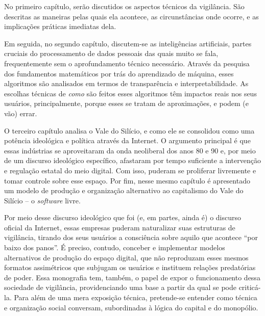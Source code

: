 No primeiro capítulo, serão discutidos os aspectos técnicos da vigilância.
São descritas as maneiras pelas quais ela acontece, as circunstâncias onde ocorre, e as implicações práticas imediatas dela.

Em seguida, no segundo capítulo, discutem-se as inteligências artificiais, partes cruciais do processamento de dados pessoais das quais muito se fala, frequentemente sem o aprofundamento técnico necessário.
Através da pesquisa dos fundamentos matemáticos por trás do aprendizado de máquina, esses algoritmos são analisados em termos de transparência e interpretabilidade.
As escolhas técnicas de \textit{como} são feitos esses algoritmos têm impactos reais nos seus usuários, principalmente, porque esses se tratam de aproximações, e podem (e vão) errar.

O terceiro capítulo analisa o Vale do Silício, e como ele se consolidou como uma potência ideológica e política através da Internet.
O argumento principal é que essas indústrias se aproveitaram da onda neoliberal dos anos 80 e 90 e, por meio de um discurso ideológico específico, afastaram por tempo suficiente a intervenção e regulação estatal do meio digital.
Com isso, puderam se proliferar livremente e tomar controle sobre esse espaço.
Por fim, nesse mesmo capítulo é apresentado um modelo de produção e organização alternativo ao capitalismo do Vale do Silício -- o \textit{software} livre.

Por meio desse discurso ideológico que foi (e, em partes, ainda é) o discurso oficial da Internet, essas empresas puderam naturalizar suas estruturas de vigilância, tirando dos seus usuários a consciência sobre aquilo que acontece ``por baixo dos panos''.
É preciso, contudo, conceber e implementar modelos alternativos de produção do espaço digital, que não reproduzam esses mesmos formatos assimétricos que subjugam os usuários e instituem relações predatórias de poder.
Essa monografia tem, também, o papel de expor o funcionamento dessa sociedade de vigilância, providenciando uma base a partir da qual se pode criticá-la.
Para além de uma mera exposição técnica, pretende-se entender como técnica e organização social conversam, subordinadas à lógica do capital e do monopólio.
